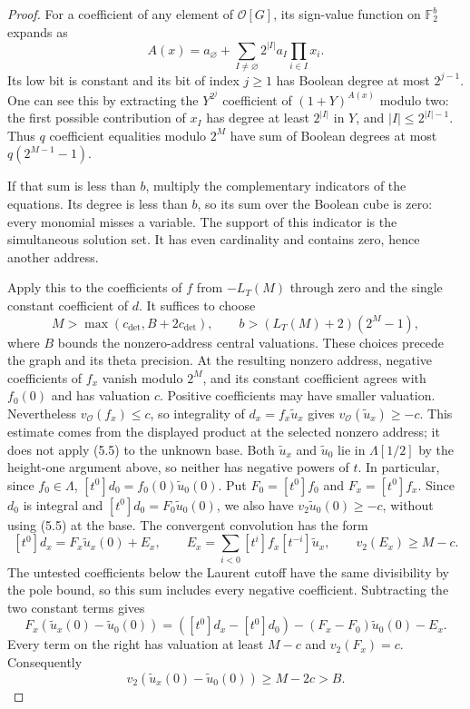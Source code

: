 \documentclass[11pt]{article}
\theoremstyle{definition}
\theoremstyle{remark}
\newcommand{\F}{\mathbb F}
\providecommand{\mathscr}[1]{\mathcal{#1}}
\begin{document}
\begin{proof}\leavevmode
For a coefficient of any element of $\mathscr O[G]$, its sign-value
function on $\F_2^b$ expands as
\[
 A(x)=a_\varnothing+
        \sum_{I\ne\varnothing}2^{|I|}a_I\prod_{i\in I}x_i .
\]
Its low bit is constant and its bit of index $j\ge1$ has Boolean
degree at most $2^{j-1}$. One can see this by extracting the
$Y^{2^j}$ coefficient of $(1+Y)^{A(x)}$ modulo two:
the first possible contribution of $x_I$ has degree at least
$2^{|I|}$ in $Y$, and $|I|\le2^{|I|-1}$.
Thus $q$ coefficient equalities modulo $2^M$ have sum of Boolean
degrees at most $q(2^{M-1}-1)$.

If that sum is less than $b$, multiply the complementary indicators
of the equations. Its degree is less than $b$, so its sum over the
Boolean cube is zero: every monomial misses a variable.
The support of this indicator is the simultaneous solution set.
It has even cardinality and contains zero, hence another address.

Apply this to the coefficients of $f$ from $-L_T(M)$ through zero
and the single constant coefficient of $d$. It suffices to choose
\[
 M>\max(c_{\det},B+2c_{\det}),\qquad
 b>(L_T(M)+2)(2^M-1),                                           \tag{5.10}
\]
where $B$ bounds the nonzero-address central valuations.
These choices precede the graph and its theta precision.
At the resulting nonzero address, negative coefficients of $f_x$
vanish modulo $2^M$, and its constant coefficient agrees with
$f_0(0)$ and has valuation $c$.
Positive coefficients may have smaller valuation. Nevertheless
$v_{\mathscr O}(f_x)\le c$, so integrality of
$d_x=f_x\widetilde u_x$ gives
$v_{\mathscr O}(\widetilde u_x)\ge-c$.
This estimate comes from the displayed product at the selected
nonzero address; it does not apply (5.5) to the unknown base.
Both $\widetilde u_x$ and $\widetilde u_0$ lie in $\Lambda[1/2]$
by the height-one argument above, so neither has negative powers
of $t$. In particular, since $f_0\in\Lambda$,
$[t^0]d_0=f_0(0)\widetilde u_0(0)$.
Put $F_0=[t^0]f_0$ and $F_x=[t^0]f_x$. Since $d_0$ is integral
and $[t^0]d_0=F_0\widetilde u_0(0)$, we also have
$v_2\widetilde u_0(0)\ge-c$, without using (5.5) at the base.
The convergent convolution has the form
\[
 [t^0]d_x=F_x\widetilde u_x(0)+E_x,\qquad
 E_x=\sum_{i<0}[t^i]f_x[t^{-i}]\widetilde u_x,
 \qquad v_2(E_x)\ge M-c.
\]
The untested coefficients below the Laurent cutoff have the same
divisibility by the pole bound, so this sum includes every negative
coefficient. Subtracting the two constant terms gives
\[
 F_x(\widetilde u_x(0)-\widetilde u_0(0))
 =([t^0]d_x-[t^0]d_0)-(F_x-F_0)\widetilde u_0(0)-E_x.
\]
Every term on the right has valuation at least $M-c$ and
$v_2(F_x)=c$. Consequently
\[
 v_2(\widetilde u_x(0)-\widetilde u_0(0))\ge M-2c>B.\tag{5.11}
\]


\end{proof}
\end{document}
